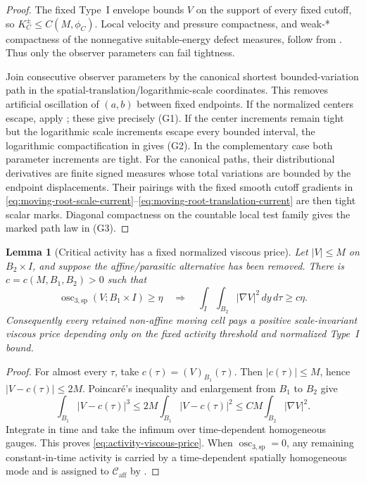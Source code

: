 \documentclass[11pt]{amsart}
\numberwithin{equation}{section}
\theoremstyle{plain}
\newtheorem{lemma}[lemma]{Lemma}
\theoremstyle{definition}
\theoremstyle{remark}
\newcommand{\Caff}{\mathcal C_{\mathrm{aff}}}
\newcommand{\oscsp}{\operatorname{osc}_{3,\mathrm{sp}}}
\begin{document}
\begin{proof}
The fixed Type~I envelope bounds \(V\) on the support of every fixed cutoff,
so \(K_C^\pm\le C(M,\phi_C)\).  Local velocity and pressure compactness, and
weak-* compactness of the nonnegative suitable-energy defect measures, follow
from
.
Thus only the observer parameters can fail tightness.

Join consecutive observer parameters by the canonical shortest
bounded-variation path in the spatial-translation/logarithmic-scale
coordinates.  This removes artificial oscillation of \((a,b)\) between fixed
endpoints.  If the normalized centers escape, apply
;
these give precisely \textup{(G1)}.  If the center increments remain tight but
the logarithmic scale increments escape every bounded interval, the
logarithmic compactification in
gives \textup{(G2)}.  In the complementary case both parameter increments are
tight.  For the canonical paths, their distributional derivatives are finite
signed measures whose total variations are bounded by the endpoint
displacements.  Their pairings with the fixed smooth cutoff gradients in
\eqref{eq:moving-root-scale-current}--\eqref{eq:moving-root-translation-current}
are then tight scalar marks.  Diagonal compactness on the countable local test
family gives the marked path law in \textup{(G3)}.
\end{proof}

\begin{lemma}[Critical activity has a fixed normalized viscous price]
\label{lem:critical-activity-viscous-price}
Let \(|V|\le M\) on \(B_2\times I\), and suppose the affine/parasitic
alternative has been removed.  There is \(c=c(M,B_1,B_2)>0\) such that
\begin{equation}\label{eq:activity-viscous-price}
 \oscsp(V;B_1\times I)\ge\eta
 \quad\Longrightarrow\quad
 \int_I\int_{B_2}|\nabla V|^2\,dy\,d\tau\ge c\eta.
\end{equation}
Consequently every retained non-affine moving cell pays a positive
scale-invariant viscous price depending only on the fixed activity threshold
and normalized Type~I bound.
\end{lemma}

\begin{proof}
For almost every \(\tau\), take \(c(\tau)=(V)_{B_1}(\tau)\).  Then
\(|c(\tau)|\le M\), hence \(|V-c(\tau)|\le2M\).  Poincar\'e's inequality and
enlargement from \(B_1\) to \(B_2\) give
\[
 \int_{B_1}|V-c(\tau)|^3
 \le2M\int_{B_1}|V-c(\tau)|^2
 \le C M\int_{B_2}|\nabla V|^2.
\]
Integrate in time and take the infimum over time-dependent homogeneous gauges.
This proves \eqref{eq:activity-viscous-price}.  When \(\oscsp=0\), any
remaining constant-in-time activity is carried by a time-dependent spatially
homogeneous mode and is assigned to \(\Caff\) by
.
\end{proof}
\end{document}
